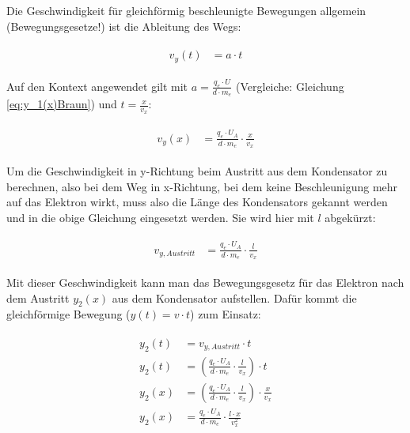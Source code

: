 Die Geschwindigkeit für gleichförmig beschleunigte Bewegungen allgemein (Bewegungsgesetze!) ist die Ableitung des Wegs:

\begin{align} \label{eq:v(t)Allgemein}
\begin{split}
	v_y(t) &= a \cdot t
\end{split}
\end{align}

\noindent Auf den Kontext angewendet gilt mit $a = \frac{q_e \cdot U}{d \cdot m_e}$ (Vergleiche: Gleichung \ref{eq:y_1(x)Braun}) und $t=\frac{x}{v_x}$:

\begin{align} \label{eq:v(x)Kontext}
\begin{split}
	v_y(x) &= \frac{q_e \cdot U_A}{d \cdot m_e} \cdot \frac{x}{v_x}
\end{split}
\end{align}

\noindent Um die Geschwindigkeit in y-Richtung beim Austritt aus dem Kondensator zu berechnen, also bei dem Weg in x-Richtung, bei dem keine Beschleunigung mehr auf das Elektron wirkt, muss also die Länge des Kondensators gekannt werden und in die obige Gleichung eingesetzt werden. Sie wird hier mit $l$ abgekürzt:

\begin{align} \label{eq:v(t)Gesamt}
\begin{split}
	v_{y,Austritt} &= \frac{q_e \cdot U_A}{d \cdot m_e} \cdot \frac{l}{v_x}
\end{split}
\end{align}

\noindent Mit dieser Geschwindigkeit kann man das Bewegungsgesetz für das Elektron nach dem Austritt $y_2(x)$ aus dem Kondensator aufstellen. Dafür kommt die gleichförmige Bewegung ($y(t) = v \cdot t$) zum Einsatz:

\begin{align} \label{eq:y(t)Gesamt}
\begin{split}
	y_2(t) &= v_{y,Austritt} \cdot t \\
	y_2(t) &= (\frac{q_e \cdot U_A}{d \cdot m_e} \cdot \frac{l}{v_x}) \cdot t \\
	y_2(x) &= (\frac{q_e \cdot U_A}{d \cdot m_e} \cdot \frac{l}{v_x}) \cdot \frac{x}{v_x} \\
	y_2(x) &= \frac{q_e \cdot U_A}{d \cdot m_e} \cdot \frac{l \cdot x}{v_{x}^2}
\end{split}
\end{align}

